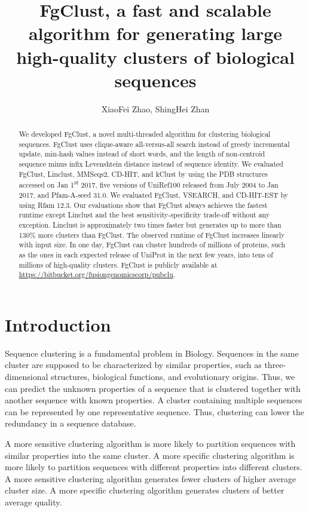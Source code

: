 \documentclass[11pt,letterpaper]{article}
\title{FgClust, a fast and scalable algorithm for generating large high-quality clusters of biological sequences}
\author{XiaoFei Zhao, ShingHei Zhan}
\begin{document}
\maketitle

\begin{abstract}
We developed FgClust, a novel multi-threaded algorithm for clustering biological sequences.
FgClust uses clique-aware all-versus-all search instead of greedy incremental update, min-hash values instead of short words, and the length of non-centroid sequence minus infix Levenshtein distance instead of sequence identity.
We evaluated FgClust, Linclust, MMSeqs2, CD-HIT, and kClust by using the PDB structures accessed on Jan 1\textsuperscript{st} 2017, five versions of UniRef100 released from July 2004 to Jan 2017, and Pfam-A-seed 31.0.
We evaluated FgClust, VSEARCH, and CD-HIT-EST by using Rfam 12.3.
Our evaluations show that FgClust always achieves the fastest runtime except Linclust and the best sensitivity-specificity trade-off without any exception.
Linclust is approximately two times faster but generates up to more than 130\% more clusters than FgClust.
The observed runtime of FgClust increases linearly with input size.
In one day, FgClust can cluster hundreds of millions of proteins, such as the ones in each expected release of UniProt in the next few years, into tens of millions of high-quality clusters.
FgClust is publicly available at \url{https://bitbucket.org/fusiongenomicscorp/pubclu}.
\end{abstract}

\section{Introduction}

Sequence clustering is a fundamental problem in Biology.
Sequences in the same cluster are supposed to be characterized by similar properties, such as three-dimensional structures, biological functions, and evolutionary origins.
Thus, we can predict the unknown properties of a sequence that is clustered together with another sequence with known properties.
A cluster containing multiple sequences can be represented by one representative sequence. 
Thus, clustering can lower the redundancy in a sequence database.

A more sensitive clustering algorithm is more likely to partition sequences with similar properties into the same cluster.
A more specific clustering algorithm is more likely to partition sequences with different properties into different clusters.
A more sensitive clustering algorithm generates fewer clusters of higher average cluster size.
A more specific clustering algorithm generates clusters of better average quality.
\end{document}
